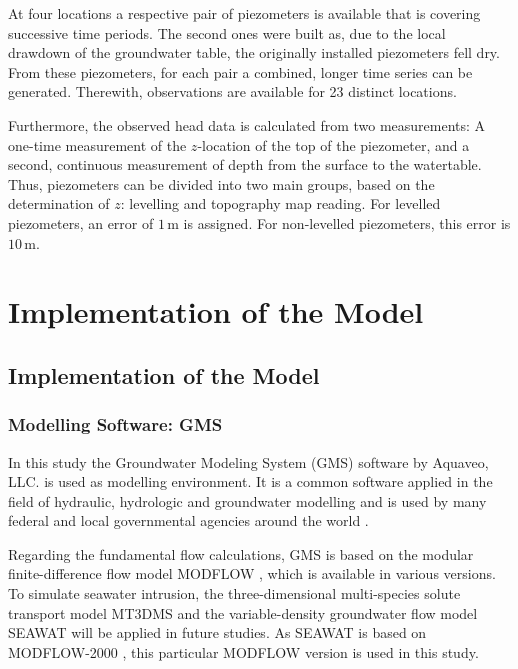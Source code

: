At four locations a respective pair of piezometers is available that is covering successive time periods. 
The second ones were built as, due to the local drawdown of the groundwater table, the originally installed piezometers fell dry. 
From these piezometers, for each pair a combined, longer time series can be generated. 
Therewith, observations are available for 23 distinct locations.

Furthermore, the observed head data is calculated from two measurements: A one-time measurement of the $z$-location of the top of the piezometer, and a second, continuous measurement of depth from the surface to the watertable. 
Thus, piezometers can be divided into two main groups, based on the determination of $z$: levelling and topography map reading. 
For levelled piezometers, an error of $1 \, \textrm{m}$ is assigned. 
For non-levelled piezometers, this error is $10 \, \textrm{m}$.


\chapter{Implementation of the Model}
\label{Chap-ImplMod}


\section{Implementation of the Model}

\subsection{Modelling Software: GMS}
\label{Sec-GMS}

In this study the Groundwater Modeling System (GMS) software by Aquaveo, LLC. is used as modelling environment. 
It is a common software applied in the field of hydraulic, hydrologic and groundwater modelling and is used by many federal and local governmental agencies around the world \parencite{Aquaveo.2021}.

Regarding the fundamental flow calculations, GMS is based on the modular finite-difference flow model MODFLOW \parencite{McDonald.1988}, which is available in various versions. 
To simulate seawater intrusion, the three-dimensional multi-species solute transport model MT3DMS \parencite{Zheng.1999} and the variable-density groundwater flow model SEAWAT \parencite{Langevin.2009} will be applied in future studies. 
As SEAWAT is based on MODFLOW-2000 \parencite{Harbaugh.2000}, this particular MODFLOW version is used in this study.

